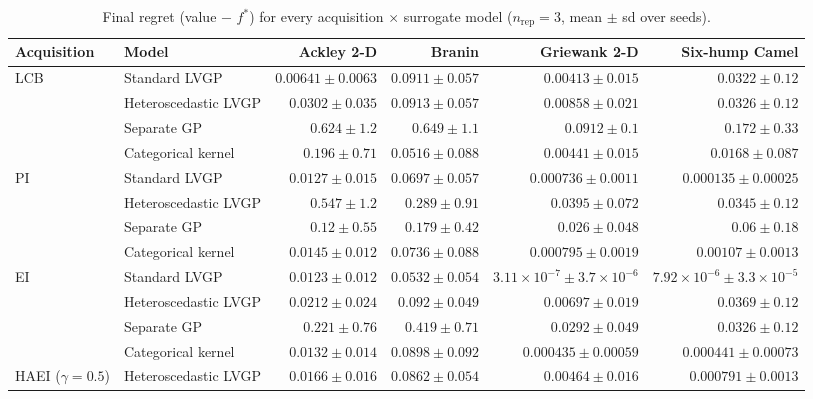 \begin{table}[htbp]
\centering
\small
\setlength{\tabcolsep}{4pt}
\setlength{\fboxsep}{2pt}
\caption{Final regret (value $-$ $f^*$) for every acquisition $\times$ surrogate model ($n_{\mathrm{rep}}=3$, mean $\pm$ sd over seeds).}
\label{tab:regret_nrep03}
\begin{tabular}{llrrrr}
\toprule
Acquisition & Model & Ackley 2-D & Branin & Griewank 2-D & Six-hump Camel \\
\midrule
LCB & Standard LVGP & \colorbox{green!20}{{\boldmath$0.00641 \pm 0.0063$}} & $0.0911 \pm 0.057$ & {\boldmath$0.00413 \pm 0.015$} & $0.0322 \pm 0.12$ \\
 & Heteroscedastic LVGP & $0.0302 \pm 0.035$ & $0.0913 \pm 0.057$ & $0.00858 \pm 0.021$ & $0.0326 \pm 0.12$ \\
 & Separate GP & $0.624 \pm 1.2$ & $0.649 \pm 1.1$ & $0.0912 \pm 0.1$ & $0.172 \pm 0.33$ \\
 & Categorical kernel & $0.196 \pm 0.71$ & {\boldmath$0.0516 \pm 0.088$} & $0.00441 \pm 0.015$ & {\boldmath$0.0168 \pm 0.087$} \\
\midrule
PI & Standard LVGP & {\boldmath$0.0127 \pm 0.015$} & {\boldmath$0.0697 \pm 0.057$} & {\boldmath$0.000736 \pm 0.0011$} & {\boldmath$0.000135 \pm 0.00025$} \\
 & Heteroscedastic LVGP & $0.547 \pm 1.2$ & $0.289 \pm 0.91$ & $0.0395 \pm 0.072$ & $0.0345 \pm 0.12$ \\
 & Separate GP & $0.12 \pm 0.55$ & $0.179 \pm 0.42$ & $0.026 \pm 0.048$ & $0.06 \pm 0.18$ \\
 & Categorical kernel & $0.0145 \pm 0.012$ & $0.0736 \pm 0.088$ & $0.000795 \pm 0.0019$ & $0.00107 \pm 0.0013$ \\
\midrule
EI & Standard LVGP & {\boldmath$0.0123 \pm 0.012$} & {\boldmath$0.0532 \pm 0.054$} & \colorbox{green!20}{{\boldmath$3.11{\times}10^{-7} \pm 3.7{\times}10^{-6}$}} & \colorbox{green!20}{{\boldmath$7.92{\times}10^{-6} \pm 3.3{\times}10^{-5}$}} \\
 & Heteroscedastic LVGP & $0.0212 \pm 0.024$ & $0.092 \pm 0.049$ & $0.00697 \pm 0.019$ & $0.0369 \pm 0.12$ \\
 & Separate GP & $0.221 \pm 0.76$ & $0.419 \pm 0.71$ & $0.0292 \pm 0.049$ & $0.0326 \pm 0.12$ \\
 & Categorical kernel & $0.0132 \pm 0.014$ & $0.0898 \pm 0.092$ & $0.000435 \pm 0.00059$ & $0.000441 \pm 0.00073$ \\
\midrule
HAEI ($\gamma=0.5$) & Heteroscedastic LVGP & $0.0166 \pm 0.016$ & $0.0862 \pm 0.054$ & $0.00464 \pm 0.016$ & {\boldmath$0.000791 \pm 0.0013$} \\

\end{tabular}
\end{table}
